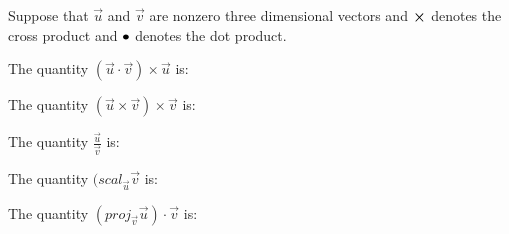 \documentclass{ximera}
\author{Jim Talamo}
\begin{document}
\begin{exercise}
Suppose that $\vec u $ and $\vec v $ are nonzero three dimensional vectors and $\boldsymbol\times$ denotes the cross product and $\bullet$ denotes the dot product.

The quantity $(\vec u \cdot \vec v) \times \vec u$ is:

\begin{multipleChoice}
\end{multipleChoice}



The quantity $(\vec u \times \vec v)\times \vec v$ is:

\begin{multipleChoice}
\end{multipleChoice}

The quantity $\frac {\vec u} {\vec v}$ is:

\begin{multipleChoice}
\end{multipleChoice}

The quantity $(scal_{\vec u} \vec v$ is:
\begin{multipleChoice}
\end{multipleChoice}

The quantity $(proj_{\vec v} \vec u)\cdot \vec v$ is:

\begin{multipleChoice}
\end{multipleChoice}



\end{exercise}
\end{document}
